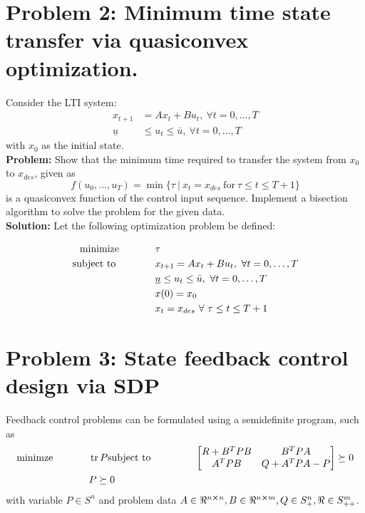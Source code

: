\documentclass[letter]{article}
\newcommand{\optpblm}[3][eq:default]{
	\begin{equation}\label{#1}
		\begin{aligned}
			\text{minimize} \hspace{0.5in} &#2\vspace{5pt}\\
			\text{subject to \hspace{0.5in}} &#3
		\end{aligned}	
	\end{equation}
}
\begin{document}
\newpage
\section{Problem 2: Minimum time state transfer via quasiconvex optimization.}
Consider the LTI system:
\begin{equation}\label{eq:quasiconvex_opt_def}
	\begin{aligned}
		x_{t+1} &= Ax_t + B u_t, \ \forall t = 0,\dots,T\\
		\underline{u} &\leq u_t \leq \bar{u}, \ \forall t = 0,\dots,T
	\end{aligned}
\end{equation}
with $x_0$ as the initial state.\\

\textbf{Problem:}
Show that the minimum time required to transfer the system from $x_0$ to $x_{des}$, given as
\begin{equation}\label{eq:qualiconvex_problem_result}
	f(u_0,\dots,u_T) = \min \{\tau \ | \ x_t = x_{des} \ \text{for} \ \tau \leq t \leq {T+1}\}
\end{equation}
is a quasiconvex function of the control input sequence. Implement a bisection algorithm to solve the problem for the given data.\\

\textbf{Solution:}
Let the following optimization problem be defined:
\optpblm{\tau}{
	x_{t+1} = Ax_t + B u_t, \ \forall t = 0,\dots,T\\
	&\underline{u} \leq u_t \leq \bar{u}, \ \forall t = 0,\dots,T\\
	& x(0) = x_0\\
	& x_t = x_{des} \ \forall \ \tau \leq t \leq T+1
	}







\newpage
\section{Problem 3: State feedback control design via SDP}
Feedback control problems can be formulated using a semidefinite program, such as
\begin{equation}\label{eq:feedback_control_def}
	\begin{aligned}
		\text{minimze} \hspace{0.5in}& \trace{P}
		\text{subject to} \hspace{0.5in}
		& \mqty [R + B^T PB & B^T PA\\
				 A^T PB & Q + A^T P A - P] \succeq 0\\
				 & P \succeq 0
	\end{aligned}
\end{equation}
with variable $P \in S^n$ and problem data $A\in \real^{n\cross n}, B \in\real^{n\cross m}, Q \in S^n_+, \real \in S^m_{++}$.\\
\end{document}
